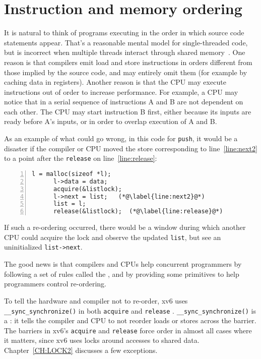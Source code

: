 \section{Instruction and memory ordering}

It is natural to think of programs executing in the order
in which source code statements appear.
That's a reasonable mental model for single-threaded
code, but is incorrect when
multiple threads interact through shared memory~\cite{riscv:user,boehm04}.
One reason is that compilers emit load and store
instructions in orders different from those implied
by the source code, and may entirely omit them
(for example by caching data in registers).
Another reason is that the CPU may execute instructions
out of order to increase performance.
For
example, a CPU may notice that in a serial sequence of
instructions A and B are not dependent on each other.
The CPU may start instruction B first, either because its
inputs are ready before A's inputs, or in order to overlap
execution of A and B.

As an example of what could go wrong,
in this code for
\lstinline{push},
it would be a disaster if the compiler or CPU moved the
store corresponding to
line~\ref{line:next2} to a point after the
\lstinline{release}
on line~\ref{line:release}:
\begin{lstlisting}[numbers=left,firstnumber=1]
      l = malloc(sizeof *l);
      l->data = data;
      acquire(&listlock);
      l->next = list;   (*@\label{line:next2}@*)
      list = l;      
      release(&listlock);  (*@\label{line:release}@*)
\end{lstlisting}
If such a re-ordering occurred, there would be a window during
which another CPU could acquire the lock and
observe the updated
\lstinline{list},
but see an uninitialized
\lstinline{list->next}.

The good news is that compilers and CPUs help concurrent programmers
by following a set of rules called the , and
by providing some primitives to help programmers control re-ordering.

To tell the hardware and compiler not to re-order,
xv6 uses
\lstinline{__sync_synchronize()} 
in both
\lstinline{acquire} 
and
\lstinline{release} .
\lstinline{__sync_synchronize()}
is a :
it tells the compiler and CPU to not reorder loads or stores across the
barrier.
The barriers in xv6's 
\lstinline{acquire}
and
\lstinline{release}
force order in almost all cases where it matters,
since xv6 uses locks around accesses to shared data.
Chapter~\ref{CH:LOCK2} discusses a few exceptions.

